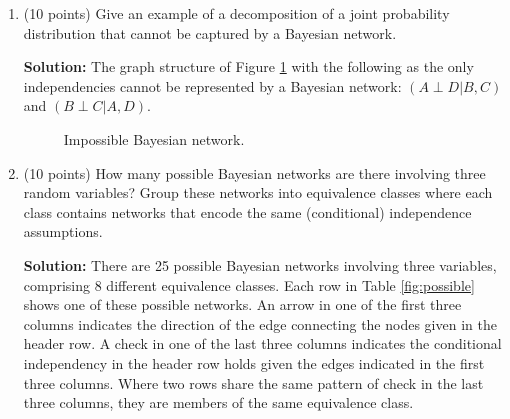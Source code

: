 \documentclass[11pt]{article}
\def\ci{\perp}
\begin{document}
\begin{enumerate}

\item (10 points) Give an example of a decomposition of a joint probability distribution that cannot be captured by a Bayesian network.

\textbf{Solution:} The graph structure of Figure \ref{fig:impossible} with the following as the only independencies cannot be represented by a Bayesian network: $(A \ci D | B,C)$ and $(B \ci C | A,D)$.

\begin{figure}[H]
\centering
{}
\caption{Impossible Bayesian network.}
\label{fig:impossible}
\end{figure}

\item (10 points) How many possible Bayesian networks are there involving three random variables? Group these networks into equivalence classes where each class contains networks that encode the same (conditional) independence assumptions.

\textbf{Solution:} There are 25 possible Bayesian networks involving three variables, comprising 8 different equivalence classes. Each row in Table \ref{fig:possible} shows one of these possible networks. An arrow in one of the first three columns indicates the direction of the edge connecting the nodes given in the header row. A check in one of the last three columns indicates the conditional independency in the header row holds given the edges indicated in the first three columns. Where two rows share the same pattern of check in the last three columns, they are members of the same equivalence class.


\end{enumerate}
\end{document}
